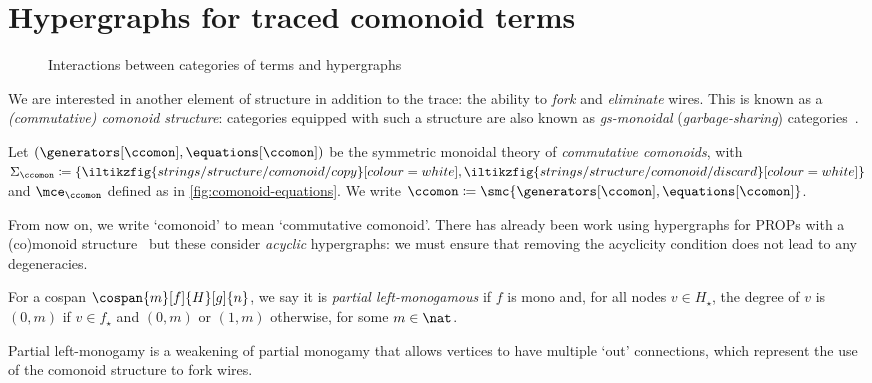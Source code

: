 \section{Hypergraphs for traced comonoid terms}

\begin{figure}
    \centering
    
    \caption{Interactions between categories of terms and hypergraphs}
    \label{fig:graph-roadmap}
\end{figure}

We are interested in another element of structure in addition to the trace: the
ability to \emph{fork} and \emph{eliminate} wires.
This is known as a \emph{(commutative) comonoid structure}: categories equipped
with such a structure are also known as \emph{gs-monoidal}
(\emph{garbage-sharing}) categories~\cite{fritz2023free}.

\begin{definition}
    Let \((\generators[\ccomon], \equations[\ccomon])\) be the symmetric
    monoidal theory of \emph{commutative comonoids}, with \(
        \Sigma_\ccomon \coloneqq \{
            \iltikzfig{strings/structure/comonoid/copy}[colour=white],
            \iltikzfig{strings/structure/comonoid/discard}[colour=white]
        \}
    \) and \(\mce_\ccomon\) defined as in \cref{fig:comonoid-equations}.
    We write \(
        \ccomon \coloneqq \smc{\generators[\ccomon], \equations[\ccomon]}
    \).
\end{definition}



From now on, we write `comonoid' to mean `commutative comonoid'.
There has already been work using hypergraphs for PROPs with a (co)monoid
structure~\cite{fritz2023free,milosavljevic2023string} but these consider
\emph{acyclic} hypergraphs: we must ensure that removing the acyclicity
condition does not lead to any degeneracies.

\begin{definition}
    For a cospan \(\cospan{m}[f]{H}[g]{n}\), we say it is
    \emph{partial left-monogamous} if \(f\) is mono and, for all nodes
    \(v \in H_\star\), the degree of \(v\) is \((0,m)\) if \(v \in f_\star\) and
    \((0,m)\) or \((1,m)\) otherwise, for some \(m \in \nat\).
\end{definition}

Partial left-monogamy is a weakening of partial monogamy that allows vertices
to have multiple `out' connections, which represent the use of the comonoid
structure to fork wires.

